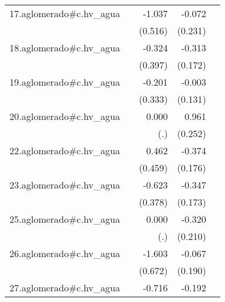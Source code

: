 {\begin{longtable}{l*{4}{D{.}{.}{-1}}}
\addlinespace
17.aglomerado#c.hv\_agua&                     &      -1.037\sym{*}  &      -0.072         &                     \\
            &                     &     (0.516)         &     (0.231)         &                     \\
\addlinespace
18.aglomerado#c.hv\_agua&                     &      -0.324         &      -0.313         &                     \\
            &                     &     (0.397)         &     (0.172)         &                     \\
\addlinespace
19.aglomerado#c.hv\_agua&                     &      -0.201         &      -0.003         &                     \\
            &                     &     (0.333)         &     (0.131)         &                     \\
\addlinespace
20.aglomerado#c.hv\_agua&                     &       0.000         &       0.961\sym{***}&                     \\
            &                     &         (.)         &     (0.252)         &                     \\
\addlinespace
22.aglomerado#c.hv\_agua&                     &       0.462         &      -0.374\sym{*}  &                     \\
            &                     &     (0.459)         &     (0.176)         &                     \\
\addlinespace
23.aglomerado#c.hv\_agua&                     &      -0.623         &      -0.347\sym{*}  &                     \\
            &                     &     (0.378)         &     (0.173)         &                     \\
\addlinespace
25.aglomerado#c.hv\_agua&                     &       0.000         &      -0.320         &                     \\
            &                     &         (.)         &     (0.210)         &                     \\
\addlinespace
26.aglomerado#c.hv\_agua&                     &      -1.603\sym{*}  &      -0.067         &                     \\
            &                     &     (0.672)         &     (0.190)         &                     \\
\addlinespace
27.aglomerado#c.hv\_agua&                     &      -0.716         &      -0.192         &                     \\

\end{longtable}}
